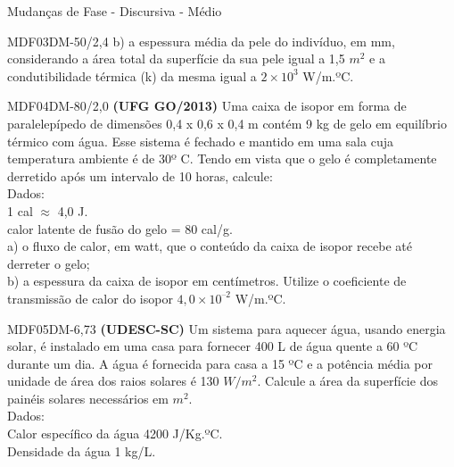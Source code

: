 \documentclass[12pt]{article}
\begin{document}
\begin{quiz}{Mudanças de Fase - Discursiva - Médio}
\begin{essay}[points=2,penalty=0,response format=file,attachments allowed=1,attachments required=1]{MDF03DM-50/2,4}
			b)	a espessura média da pele do indivíduo, em mm, considerando a área total da superfície da sua pele igual a 1,5 $m^{2}$ e a condutibilidade térmica (k) da mesma igual a $2\times10^{3}$ W/m.ºC.				
		\end{essay}
		\begin{essay}[points=2,penalty=0,response format=file,attachments allowed=1,attachments required=1]{MDF04DM-80/2,0}
			\textbf{(UFG GO/2013)} Uma caixa de isopor em forma de paralelepípedo de dimensões 0,4 x 0,6 x 0,4 m contém 9 kg de gelo em equilíbrio térmico com água. Esse sistema é fechado e mantido em uma sala cuja temperatura ambiente é de 30º C. Tendo em vista que o gelo é completamente derretido após um intervalo de 10 horas, calcule:\\
			Dados:\\
			1 cal $\approx$ 4,0 J.\\
			calor latente de fusão do gelo = 80 cal/g.\\			
			a) o fluxo de calor, em watt, que o conteúdo da caixa de isopor recebe até derreter o gelo;\\
			b) a espessura da caixa de isopor em centímetros. Utilize o coeficiente de transmissão de calor do isopor $4,0\times10^{–2}$ W/m.ºC.								
		\end{essay}
		\begin{essay}[points=2,penalty=0,response format=file,attachments allowed=1,attachments required=1]{MDF05DM-6,73}
			\textbf{(UDESC-SC)} Um sistema para aquecer água, usando energia solar, é instalado em uma casa para fornecer 400 L de água quente a 60 ºC durante um dia. A água é fornecida para casa a 15 ºC e a potência média por unidade de área dos raios solares é 130 $W/m^{2}$. Calcule a área da superfície dos painéis solares necessários em $m^{2}$.\\
			Dados:\\
			Calor específico da água 4200 J/Kg.ºC.\\
			Densidade da água 1 kg/L.											
		\end{essay}										
	\end{quiz}
\end{document}
